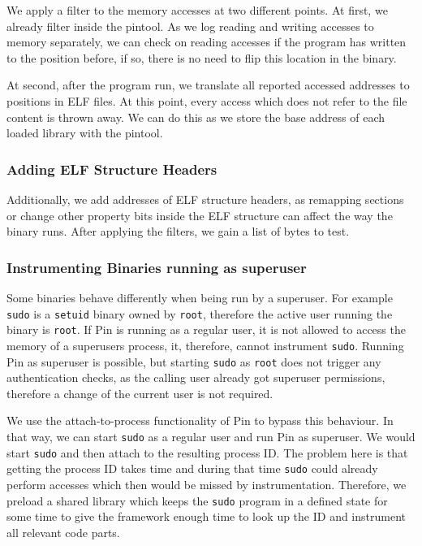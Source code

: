 We apply a filter to the memory accesses at two different points. At first, we
already filter inside the pintool. As we log reading and writing accesses to
memory separately, we can check on reading accesses if the program
has written to the position before, if so, there is no need to flip this
location in the binary.

At second, after the program run, we translate all reported accessed addresses
to positions in ELF files. At this point, every access which does not refer to
the file content is thrown away. We can do this as we store the base address of
each loaded library with the pintool.

\subsubsection{Adding ELF Structure Headers}

Additionally, we add addresses of ELF structure headers, as remapping sections
or change other property bits inside the ELF structure can affect the way the
binary runs. After applying the filters, we gain a list of bytes to test.

\subsubsection{Instrumenting Binaries running as superuser}

Some binaries behave differently when being run by a superuser. For example
\texttt{sudo} is a \texttt{setuid} binary owned by \texttt{root}, therefore the
active user running the binary is \texttt{root}. If Pin is running as a regular
user, it is not allowed to access the memory of a superuser\textquotesingle s
process, it, therefore, cannot instrument \texttt{sudo}. Running Pin as
superuser is possible, but starting \texttt{sudo} as \texttt{root} does not
trigger any authentication checks, as the calling user already got superuser
permissions, therefore a change of the current user is not required.

We use the attach-to-process functionality of Pin to bypass this behaviour. In
that way, we can start \texttt{sudo} as a regular user and run Pin as superuser.
We would start \texttt{sudo} and then attach to the resulting process ID. The
problem here is that getting the process ID takes time and during that time
\texttt{sudo} could already perform accesses which then would be missed by
instrumentation. Therefore, we preload a shared library which keeps the
\texttt{sudo} program in a defined state for some time to give the framework
enough time to look up the ID and instrument all relevant code parts.

